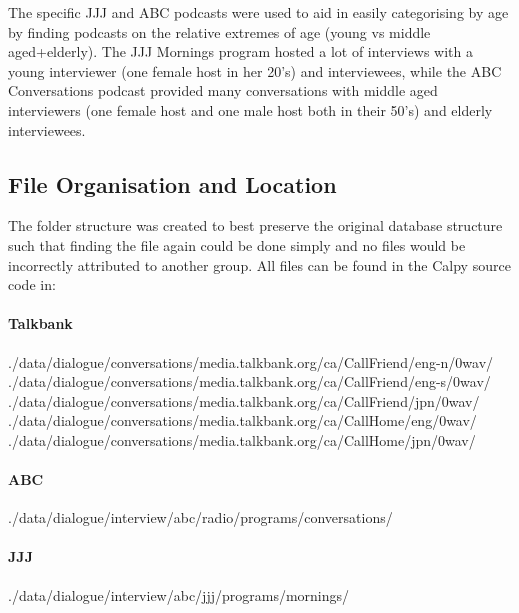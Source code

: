 The specific JJJ and ABC podcasts were used to aid in easily categorising by age by finding podcasts on the relative extremes of age (young vs middle aged+elderly). The JJJ Mornings program hosted a lot of interviews with a young interviewer (one female host in her 20's) and interviewees, while the ABC Conversations podcast provided many conversations with middle aged interviewers (one female host and one male host both in their 50's) and elderly interviewees. 

\subsection{File Organisation and Location} 
The folder structure was created to best preserve the original database structure such that finding the file again could be done simply and no files would be incorrectly attributed to another group. All files can be found in the Calpy source code in:

\paragraph{Talkbank\\}
\indent ./data/dialogue/conversations/media.talkbank.org/ca/CallFriend/eng-n/0wav/ \\
\indent ./data/dialogue/conversations/media.talkbank.org/ca/CallFriend/eng-s/0wav/ \\
\indent ./data/dialogue/conversations/media.talkbank.org/ca/CallFriend/jpn/0wav/
\indent ./data/dialogue/conversations/media.talkbank.org/ca/CallHome/eng/0wav/
\indent ./data/dialogue/conversations/media.talkbank.org/ca/CallHome/jpn/0wav/

\paragraph{ABC\\}
./data/dialogue/interview/abc/radio/programs/conversations/

\paragraph{JJJ\\} 
./data/dialogue/interview/abc/jjj/programs/mornings/

